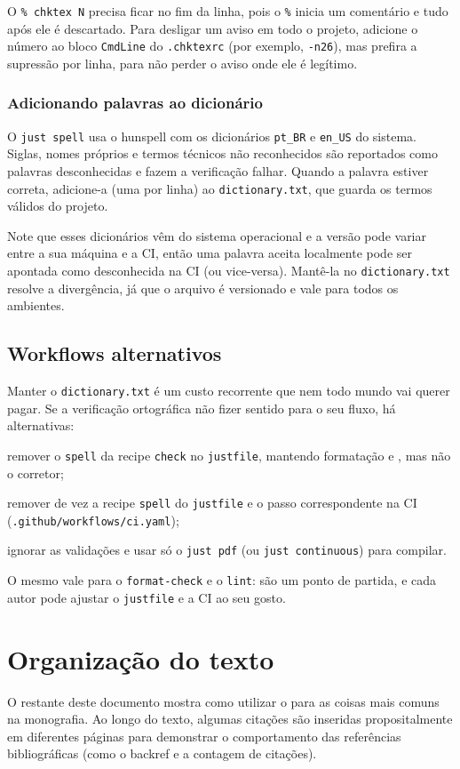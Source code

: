 O \texttt{\% chktex N} precisa ficar no fim da linha, pois o \texttt{\%} inicia um comentário e tudo após ele é descartado. Para desligar um aviso em todo o projeto, adicione o número ao bloco \texttt{CmdLine} do \texttt{.chktexrc} (por exemplo, \texttt{-n26}), mas prefira a supressão por linha, para não perder o aviso onde ele é legítimo.

\subsubsection{Adicionando palavras ao dicionário} \label{sub:dicionario}

O \texttt{just spell} usa o hunspell com os dicionários \texttt{pt\_BR} e \texttt{en\_US} do sistema. Siglas, nomes próprios e termos técnicos não reconhecidos são reportados como palavras desconhecidas e fazem a verificação falhar. Quando a palavra estiver correta, adicione-a (uma por linha) ao \texttt{dictionary.txt}, que guarda os termos válidos do projeto.

Note que esses dicionários vêm do sistema operacional e a versão pode variar entre a sua máquina e a CI, então uma palavra aceita localmente pode ser apontada como desconhecida na CI (ou vice-versa). Mantê-la no \texttt{dictionary.txt} resolve a divergência, já que o arquivo é versionado e vale para todos os ambientes.

\subsection{Workflows alternativos}

Manter o \texttt{dictionary.txt} é um custo recorrente que nem todo mundo vai querer pagar. Se a verificação ortográfica não fizer sentido para o seu fluxo, há alternativas:

\begin{alineas}
  \item remover o \texttt{spell} da recipe \texttt{check} no \texttt{justfile}, mantendo formatação e , mas não o corretor;

  \item remover de vez a recipe \texttt{spell} do \texttt{justfile} e o passo correspondente na CI (\texttt{.github/workflows/ci.yaml});

  \item ignorar as validações e usar só o \texttt{just pdf} (ou \texttt{just continuous}) para compilar.
\end{alineas}

O mesmo vale para o \texttt{format-check} e o \texttt{lint}: são um ponto de partida, e cada autor pode ajustar o \texttt{justfile} e a CI ao seu gosto.

\section{Organização do texto}

O restante deste documento mostra como utilizar o \template{} para as coisas mais comuns na monografia. Ao longo do texto, algumas citações são inseridas propositalmente em diferentes páginas para demonstrar o comportamento das referências bibliográficas (como o backref e a contagem de citações).
